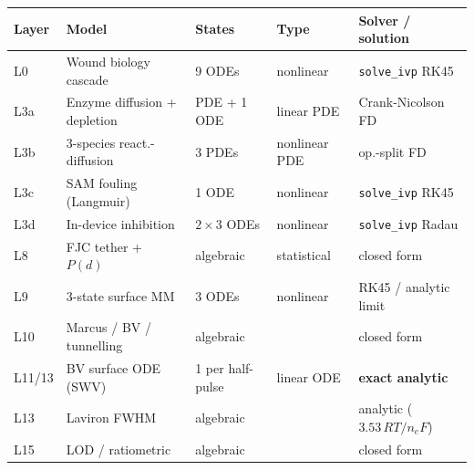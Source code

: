 \documentclass[10pt,a4paper]{article}
\numberwithin{equation}{section}
\begin{document}
\begin{tabular}{@{}p{1.1cm}p{4.2cm}p{2.0cm}p{1.7cm}p{4.0cm}@{}}
\toprule
\textbf{Layer} & \textbf{Model} & \textbf{States} & \textbf{Type} & \textbf{Solver / solution} \\
\midrule
L0   & Wound biology cascade & 9 ODEs & nonlinear & \texttt{solve\_ivp} RK45 \\
L3a  & Enzyme diffusion + depletion & PDE + 1 ODE & linear PDE & Crank-Nicolson FD \\
L3b  & 3-species react.-diffusion & 3 PDEs & nonlinear PDE & op.-split FD \\
L3c  & SAM fouling (Langmuir) & 1 ODE & nonlinear & \texttt{solve\_ivp} RK45 \\
L3d  & In-device inhibition & $2\times3$ ODEs & nonlinear & \texttt{solve\_ivp} Radau \\
L8   & FJC tether + $P(d)$ & algebraic & statistical & closed form \\
L9   & 3-state surface MM & 3 ODEs & nonlinear & RK45 / analytic limit \\
L10  & Marcus / BV / tunnelling & algebraic & & closed form \\
L11/13 & BV surface ODE (SWV) & 1 per half-pulse & linear ODE & \textbf{exact analytic} \\
L13  & Laviron FWHM & algebraic & & analytic ($3.53\,RT/n_eF$) \\
L15  & LOD / ratiometric & algebraic & & closed form \\
\bottomrule
\end{tabular}
\end{document}
